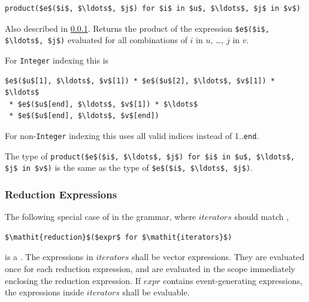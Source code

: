 \begin{operatordefinition*}[product]\label{modelica:product-reduction}
\begin{synopsis}\begin{lstlisting}
product($e$($i$, $\ldots$, $j$) for $i$ in $u$, $\ldots$, $j$ in $v$)
\end{lstlisting}\end{synopsis}
\begin{semantics}
Also described in \cref{reduction-expressions}.
Returns the product of the expression \lstinline!$e$($i$, $\ldots$, $j$)! evaluated for all combinations of $i$ in $u$, \ldots, $j$ in $v$.

For \lstinline!Integer! indexing this is
\begin{lstlisting}[language=modelica]
$e$($u$[1], $\ldots$, $v$[1]) * $e$($u$[2], $\ldots$, $v$[1]) * $\ldots$
 * $e$($u$[end], $\ldots$, $v$[1]) * $\ldots$
 * $e$($u$[end], $\ldots$, $v$[end])
\end{lstlisting}
For non-\lstinline!Integer! indexing this uses all valid indices instead of 1..\lstinline!end!.

The type of \lstinline!product($e$($i$, $\ldots$, $j$) for $i$ in $u$, $\ldots$, $j$ in $v$)! is the same as the type of \lstinline!$e$($i$, $\ldots$, $j$)!.
\end{semantics}
\end{operatordefinition*}

\subsubsection{Reduction Expressions}\label{reduction-expressions}

The following special case of  in the grammar, where $\mathit{iterators}$ should match ,
\begin{lstlisting}[language=modelica]
$\mathit{reduction}$($expr$ for $\mathit{iterators}$)
\end{lstlisting}%
is a .
The expressions in $\mathit{iterators}$ shall be vector expressions.
They are evaluated once for each reduction expression, and are evaluated in the scope immediately enclosing the reduction expression.
If $expr$ contains event-generating expressions, the expressions inside $\mathit{iterators}$ shall be evaluable.

